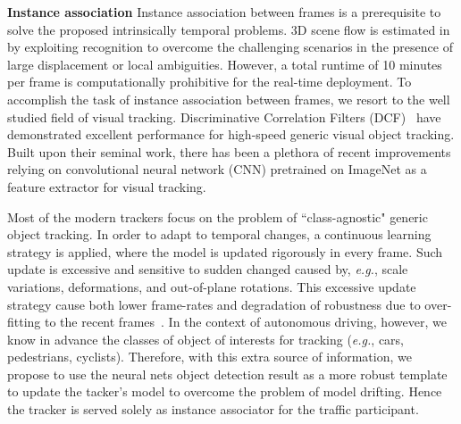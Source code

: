 \documentclass[10pt,twocolumn,letterpaper]{article}
\begin{document}



\noindent \textbf{Instance association} Instance association between frames is a prerequisite to solve the proposed intrinsically temporal problems.  3D scene flow is estimated in~\cite{behl2017bounding} by exploiting recognition to overcome the challenging scenarios in the presence of large displacement or local ambiguities.
However, a total runtime of 10 minutes per frame is computationally prohibitive for the real-time deployment.
To accomplish the task of instance association between frames, we resort to the well studied field of visual tracking.
Discriminative Correlation Filters (DCF)~\cite{henriques2015high} have demonstrated excellent performance for high-speed generic visual object tracking.
Built upon their seminal work, there has been a plethora of recent improvements~\cite{hong2015online, ma2015hierarchical,danelljan2016beyond,held2016learning, wu2017kernalised,danelljan2017eco} relying on convolutional neural network (CNN) pretrained on ImageNet as a feature extractor for visual tracking.

Most of the modern trackers focus on the problem of ``class-agnostic" generic object tracking. In order to adapt to temporal changes, a continuous learning strategy is applied, where the model is updated rigorously in every frame. Such update is excessive and sensitive to sudden changed caused by, \emph{e.g.}, scale variations, deformations, and out-of-plane rotations. This excessive update strategy cause both lower frame-rates and degradation of robustness due to over-fitting to the recent frames~\cite{danelljan2017eco}.
In the context of autonomous driving, however, we know in advance the classes of object of interests for tracking (\emph{e.g.}, cars, pedestrians, cyclists). Therefore, with this extra source of information, we propose to use the neural nets object detection result as a more robust template to update the tacker's model to overcome the problem of model drifting. Hence the tracker is served solely as instance associator for the traffic participant.
\end{document}
